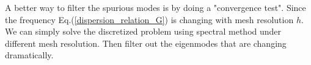 A better way to filter the spurious modes is by doing a "convergence test". Since the frequency Eq.(\ref{dispersion_relation_G}) is changing with mesh resolution $h$. We can simply solve the discretized problem using spectral method under different mesh resolution. Then filter out the eigenmodes that are changing dramatically.